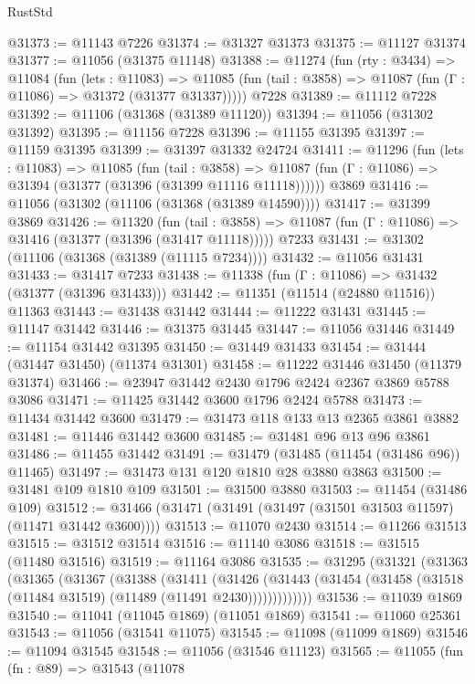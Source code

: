 \begin{lexlean}{RustStd}
\begin{coremodule}
@31373 := @11143 @7226
@31374 := @31327 @31373
@31375 := @11127 @31374
@31377 := @11056 (@31375 @11148)
@31388 := @11274
    (fun (rty : @3434) =>
    @11084
      (fun (lets : @11083) =>
      @11085 (fun (tail : @3858) => @11087 (fun (Γ : @11086) => @31372 (@31377 @31337)))))
    @7228
@31389 := @11112 @7228
@31392 := @11106 (@31368 (@31389 @11120))
@31394 := @11056 (@31302 @31392)
@31395 := @11156 @7228
@31396 := @11155 @31395
@31397 := @11159 @31395
@31399 := @31397 @31332 @24724
@31411 := @11296
    (fun (lets : @11083) =>
    @11085
      (fun (tail : @3858) =>
      @11087 (fun (Γ : @11086) => @31394 (@31377 (@31396 (@31399 @11116 @11118))))))
    @3869
@31416 := @11056 (@31302 (@11106 (@31368 (@31389 @14590))))
@31417 := @31399 @3869
@31426 := @11320
    (fun (tail : @3858) => @11087 (fun (Γ : @11086) => @31416 (@31377 (@31396 (@31417 @11118)))))
    @7233
@31431 := @31302 (@11106 (@31368 (@31389 (@11115 @7234))))
@31432 := @11056 @31431
@31433 := @31417 @7233
@31438 := @11338 (fun (Γ : @11086) => @31432 (@31377 (@31396 @31433)))
@31442 := @11351 (@11514 (@24880 @11516)) @11363
@31443 := @31438 @31442
@31444 := @11222 @31431
@31445 := @11147 @31442
@31446 := @31375 @31445
@31447 := @11056 @31446
@31449 := @11154 @31442 @31395
@31450 := @31449 @31433
@31454 := @31444 (@31447 @31450) (@11374 @31301)
@31458 := @11222 @31446 @31450 (@11379 @31374)
@31466 := @23947 @31442 @2430 @1796 @2424 @2367 @3869 @5788 @3086
@31471 := @11425 @31442 @3600 @1796 @2424 @5788
@31473 := @11434 @31442 @3600
@31479 := @31473 @118 @133 @13 @2365 @3861 @3882
@31481 := @11446 @31442 @3600
@31485 := @31481 @96 @13 @96 @3861
@31486 := @11455 @31442
@31491 := @31479 (@31485 (@11454 (@31486 @96)) @11465)
@31497 := @31473 @131 @120 @1810 @28 @3880 @3863
@31500 := @31481 @109 @1810 @109
@31501 := @31500 @3880
@31503 := @11454 (@31486 @109)
@31512 := @31466 (@31471 (@31491 (@31497 (@31501 @31503 @11597) (@11471 @31442 @3600))))
@31513 := @11070 @2430
@31514 := @11266 @31513
@31515 := @31512 @31514
@31516 := @11140 @3086
@31518 := @31515 (@11480 @31516)
@31519 := @11164 @3086
@31535 := @31295
    (@31321
      (@31363
        (@31365
          (@31367
            (@31388
              (@31411
                (@31426
                  (@31443 (@31454 (@31458 (@31518 (@11484 @31519) (@11489 (@11491 @2430)))))))))))))
@31536 := @11039 @1869
@31540 := @11041 (@11045 @1869) (@11051 @1869)
@31541 := @11060 @25361
@31543 := @11056 (@31541 @11075)
@31545 := @11098 (@11099 @1869)
@31546 := @11094 @31545
@31548 := @11056 (@31546 @11123)
@31565 := @11055
    (fun (fn : @89) =>
    @31543
      (@11078

\end{coremodule}
\end{lexlean}
